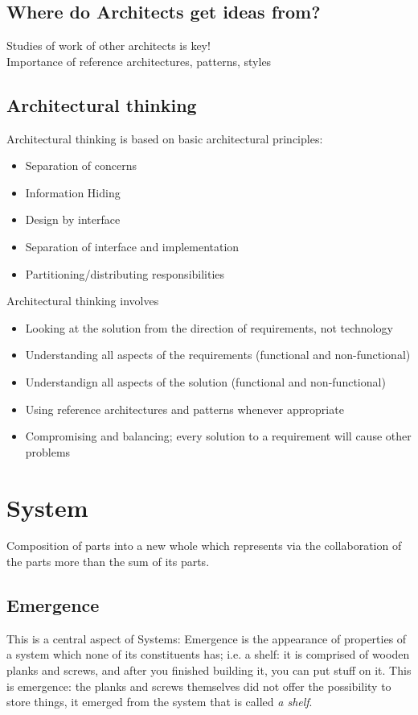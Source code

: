 		\subsection{Where do Architects get ideas from?}
			Studies of work of other architects is key!\\
			Importance of reference architectures, patterns, styles\Biglb
		
		\subsection{Architectural thinking}
			Architectural thinking is based on basic architectural principles:
			\begin{itemize}
				\item Separation of concerns
				\item Information Hiding
				\item Design by interface
				\item Separation of interface and implementation
				\item Partitioning/distributing responsibilities
			\end{itemize}
			Architectural thinking involves
			\begin{itemize}
				\item Looking at the solution from the direction of requirements, not technology
				\item Understanding all aspects of the requirements (functional and non-functional)
				\item Understandign all aspects of the solution (functional and non-functional)
				\item Using reference architectures and patterns whenever appropriate
				\item Compromising and balancing; every solution to a requirement will cause other problems
			\end{itemize}
			
			
		
	\section{System}
		Composition of parts into a new whole which represents via the collaboration of the parts more than the sum of its parts.
		
		\subsection{Emergence}
		This is a central aspect of Systems: Emergence is the appearance of properties of a system which none
		of its constituents has; i.e. a shelf: it is comprised of wooden planks and screws, and after you finished building it, you can put stuff on it. This is emergence: the planks and screws themselves did not offer the possibility to store things, it emerged from the system that is called \textit{a shelf}.
		
